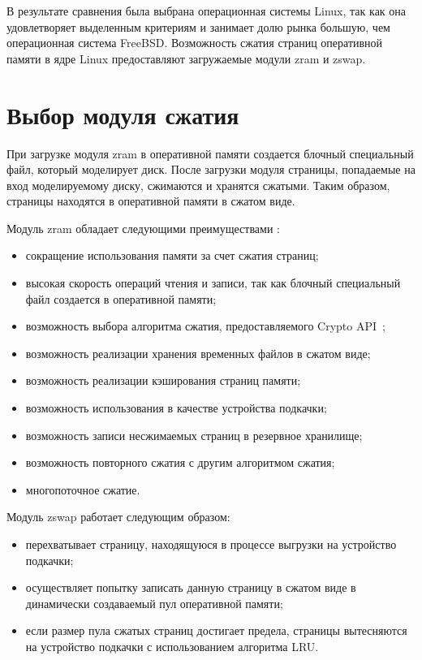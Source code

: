 В результате сравнения была выбрана операционная системы Linux, так как она удовлетворяет выделенным критериям и занимает долю рынка большую, чем операционная система FreeBSD. Возможность сжатия страниц оперативной памяти в ядре Linux предоставляют загружаемые модули zram и zswap.

\section{Выбор модуля сжатия}

При загрузке модуля zram в оперативной памяти создается блочный специальный файл, который моделирует диск. После загрузки модуля страницы, попадаемые на вход моделируемому диску, сжимаются и хранятся сжатыми. Таким образом, страницы находятся в оперативной памяти в сжатом виде.

Модуль zram обладает следующими преимуществами \cite{zram}:

\begin{itemize}
	\item сокращение использования памяти за счет сжатия страниц;
	\item высокая скорость операций чтения и записи, так как блочный специальный файл создается в оперативной памяти;
    \item возможность выбора алгоритма сжатия, предоставляемого Crypto API~\cite{crypto};
    \item возможность реализации хранения временных файлов в сжатом виде;
    \item возможность реализации кэширования страниц памяти;
    \item возможность использования в качестве устройства подкачки;
    \item возможность записи несжимаемых страниц в резервное хранилище;
    \item возможность повторного сжатия с другим алгоритмом сжатия;
    \item многопоточное сжатие.
\end{itemize}

Модуль zswap работает следующим образом:

\begin{itemize}
    \item перехватывает страницу, находящуюся в процессе выгрузки на устройство подкачки;
    \item осуществляет попытку записать данную страницу в сжатом виде в динамически создаваемый пул оперативной памяти;
    \item если размер пула сжатых страниц достигает предела, страницы вытесняются на устройство подкачки с использованием алгоритма LRU.
\end{itemize}

